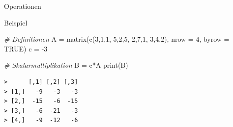 \documentclass[
  8pt,
  ignorenonframetext,
]{beamer}
\newenvironment{Shaded}{\begin{snugshade}}{\end{snugshade}}
\newcommand{\AttributeTok}[1]{\textcolor[rgb]{0.77,0.63,0.00}{#1}}
\newcommand{\CommentTok}[1]{\textcolor[rgb]{0.56,0.35,0.01}{\textit{#1}}}
\newcommand{\ConstantTok}[1]{\textcolor[rgb]{0.00,0.00,0.00}{#1}}
\newcommand{\DecValTok}[1]{\textcolor[rgb]{0.00,0.00,0.81}{#1}}
\newcommand{\FunctionTok}[1]{\textcolor[rgb]{0.00,0.00,0.00}{#1}}
\newcommand{\NormalTok}[1]{#1}
\newcommand{\OtherTok}[1]{\textcolor[rgb]{0.56,0.35,0.01}{#1}}
\newcommand{\SpecialCharTok}[1]{\textcolor[rgb]{0.00,0.00,0.00}{#1}}
\begin{document}
\begin{frame}[fragile]{Operationen}
\protect\hypertarget{operationen-8}{}
\small

Beispiel \vspace{5mm}

\footnotesize

\begin{Shaded}
\begin{Highlighting}[]
\CommentTok{\# Definitionen}
\NormalTok{A }\OtherTok{=} \FunctionTok{matrix}\NormalTok{(}\FunctionTok{c}\NormalTok{(}\DecValTok{3}\NormalTok{,}\DecValTok{1}\NormalTok{,}\DecValTok{1}\NormalTok{,}
             \DecValTok{5}\NormalTok{,}\DecValTok{2}\NormalTok{,}\DecValTok{5}\NormalTok{,}
             \DecValTok{2}\NormalTok{,}\DecValTok{7}\NormalTok{,}\DecValTok{1}\NormalTok{,}
             \DecValTok{3}\NormalTok{,}\DecValTok{4}\NormalTok{,}\DecValTok{2}\NormalTok{),}
           \AttributeTok{nrow =} \DecValTok{4}\NormalTok{,}
           \AttributeTok{byrow =} \ConstantTok{TRUE}\NormalTok{)}
\NormalTok{c }\OtherTok{=} \SpecialCharTok{{-}}\DecValTok{3}

\CommentTok{\# Skalarmultiplikation}
\NormalTok{B }\OtherTok{=}\NormalTok{ c}\SpecialCharTok{*}\NormalTok{A}
\FunctionTok{print}\NormalTok{(B)}
\end{Highlighting}
\end{Shaded}

\begin{verbatim}
>      [,1] [,2] [,3]
> [1,]   -9   -3   -3
> [2,]  -15   -6  -15
> [3,]   -6  -21   -3
> [4,]   -9  -12   -6
\end{verbatim}
\end{frame}
\end{document}

